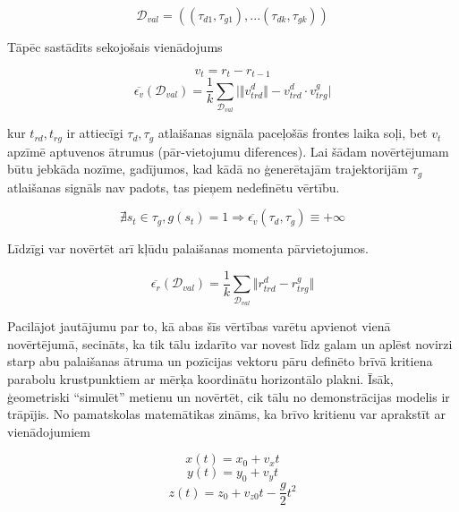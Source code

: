 \documentclass[12pt, a4paper]{article}
\numberwithin{equation}{section} %
\begin{document}
\begin{equation}
    \mathcal{D}_{val} = \left (  (\tau_{d1}, \tau_{g1}), ...
     (\tau_{dk}, \tau_{gk}) \right )
\end{equation}

Tāpēc sastādīts sekojošais vienādojums

\begin{equation}
    v_t = r_t - r_{t-1}
\end{equation}
\begin{equation}
    \overline{\epsilon_v}(\mathcal{D}_{val}) = \frac{1}{k} \sum_{\mathcal{D}_{val}}
    \vert \Vert v^d_{trd} \Vert - v^d_{trd} \cdot v^g_{trg} \vert 
\end{equation}

kur $t_{rd}, t_{rg}$ ir attiecīgi $\tau_{d}, \tau_{g}$ atlaišanas signāla paceļošās frontes laika soļi, bet $v_t$ apzīmē aptuvenos ātrumus (pār-vietojumu diferences). Lai šādam novērtējumam būtu jebkāda nozīme, gadījumos, kad kādā no ģenerētajām trajektorijām $\tau_{g}$ atlaišanas signāls nav padots, tas pieņem nedefinētu vērtību.

\begin{equation}
    \nexists s_t \in \tau_{g}, g(s_t) = 1 
    \Rightarrow
    \overline{\epsilon_v}(\tau_{d},\tau_{g}) \equiv +\infty 
\end{equation}

Līdzīgi var novērtēt arī kļūdu palaišanas momenta pārvietojumos.

\begin{equation}
    \overline{\epsilon_r}(\mathcal{D}_{val}) = \frac{1}{k} \sum_{\mathcal{D}_{val}}
    \Vert r^d_{trd} - r^g_{trg} \Vert 
\end{equation}

Pacilājot jautājumu par to, kā abas šīs vērtības varētu apvienot vienā novērtējumā, secināts, ka tik tālu izdarīto var novest līdz galam un aplēst novirzi starp abu palaišanas ātruma un pozīcijas vektoru pāru definēto brīvā kritiena parabolu krustpunktiem ar mērķa koordinātu horizontālo plakni. Īsāk, ģeometriski ``simulēt'' metienu un novērtēt, cik tālu no demonstrācijas modelis ir trāpījis. No pamatskolas matemātikas zināms, ka brīvo kritienu var aprakstīt ar vienādojumiem

\begin{equation}
    x(t) = x_0 + v_xt 
\end{equation}
\begin{equation}
    y(t) = y_0 + v_yt 
\end{equation}
\begin{equation}
    z(t) = z_0 + v_{z0}t - \frac{g}{2}t^2 
\end{equation}
\end{document}
